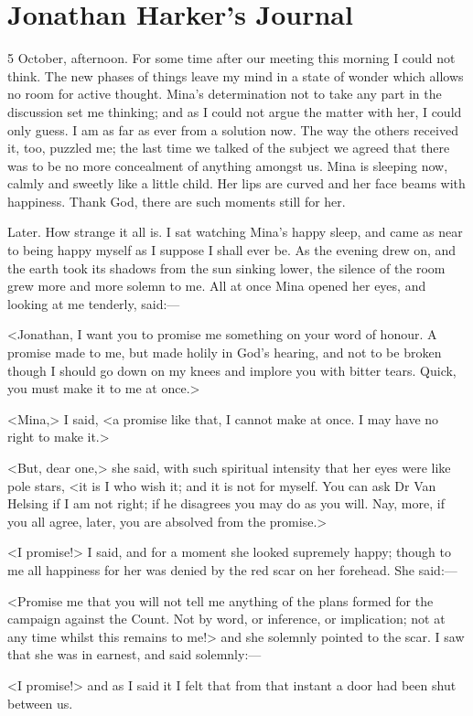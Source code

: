 \section{Jonathan Harker's Journal}

\begin{diary}{5 October, afternoon.}
For some time after our meeting this morning I could not think. The new phases of things leave my mind in a state of wonder which allows no room for active thought. Mina's determination not to take any part in the discussion set me thinking; and as I could not argue the matter with her, I could only guess. I am as far as ever from a solution now. The way the others received it, too, puzzled me; the last time we talked of the subject we agreed that there was to be no more concealment of anything amongst us. Mina is sleeping now, calmly and sweetly like a little child. Her lips are curved and her face beams with happiness. Thank God, there are such moments still for her.
\end{diary}
 

\begin{diary}{Later.}
How strange it all is. I sat watching Mina's happy sleep, and came as near to being happy myself as I suppose I shall ever be. As the evening drew on, and the earth took its shadows from the sun sinking lower, the silence of the room grew more and more solemn to me. All at once Mina opened her eyes, and looking at me tenderly, said:—

<Jonathan, I want you to promise me something on your word of honour. A promise made to me, but made holily in God's hearing, and not to be broken though I should go down on my knees and implore you with bitter tears. Quick, you must make it to me at once.>

<Mina,> I said, <a promise like that, I cannot make at once. I may have no right to make it.>

<But, dear one,> she said, with such spiritual intensity that her eyes were like pole stars, <it is I who wish it; and it is not for myself. You can ask Dr Van Helsing if I am not right; if he disagrees you may do as you will. Nay, more, if you all agree, later, you are absolved from the promise.>

<I promise!> I said, and for a moment she looked supremely happy; though to me all happiness for her was denied by the red scar on her forehead. She said:—

<Promise me that you will not tell me anything of the plans formed for the campaign against the Count. Not by word, or inference, or implication; not at any time whilst this remains to me!> and she solemnly pointed to the scar. I saw that she was in earnest, and said solemnly:—

<I promise!> and as I said it I felt that from that instant a door had been shut between us.
\end{diary}
 

